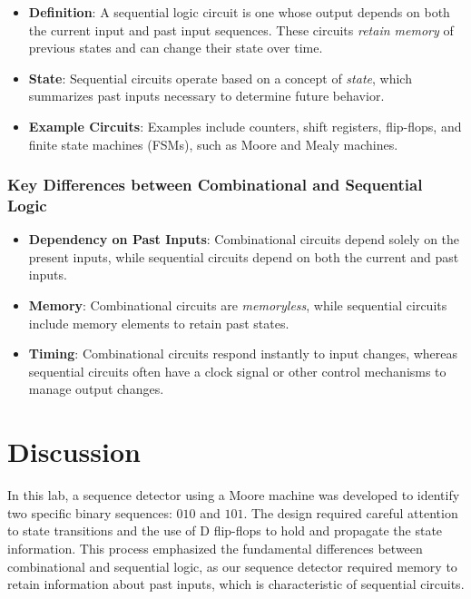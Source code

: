 \documentclass[12pt]{article}
\begin{document}
\begin{itemize}
	\item \textbf{Definition}: A sequential logic circuit is one whose output depends on both the current input and past input sequences. These circuits \textit{retain memory} of previous states and can change their state over time.
	\item \textbf{State}: Sequential circuits operate based on a concept of \textit{state}, which summarizes past inputs necessary to determine future behavior.
	\item \textbf{Example Circuits}: Examples include counters, shift registers, flip-flops, and finite state machines (FSMs), such as Moore and Mealy machines.
\end{itemize}

\hline

\subsubsection*{Key Differences between Combinational and Sequential Logic}
\begin{itemize}
	\item \textbf{Dependency on Past Inputs}: Combinational circuits depend solely on the present inputs, while sequential circuits depend on both the current and past inputs.
	\item \textbf{Memory}: Combinational circuits are \textit{memoryless}, while sequential circuits include memory elements to retain past states.
	\item \textbf{Timing}: Combinational circuits respond instantly to input changes, whereas sequential circuits often have a clock signal or other control mechanisms to manage output changes.
\end{itemize}
\vspace{.5mm}
\hline
\section*{Discussion}
\quad In this lab, a sequence detector using a Moore machine was developed to identify two specific binary sequences: \( 010 \) and \( 101 \). The design required careful attention to state transitions and the use of D flip-flops to hold and propagate the state information. This process emphasized the fundamental differences between combinational and sequential logic, as our sequence detector required memory to retain information about past inputs, which is characteristic of sequential circuits.
\end{document}
